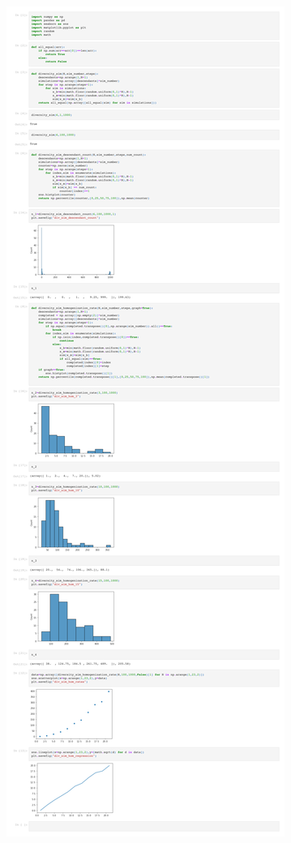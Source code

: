 \documentclass[addpoints, 11pt]{exam}
\begin{document}
\begin{questions}
\begin{figure}[H]
	\includegraphics[scale=0.18]{Math 142 Homework 5 Q_1.pdf}
\end{figure}


\end{questions}
\end{document}
